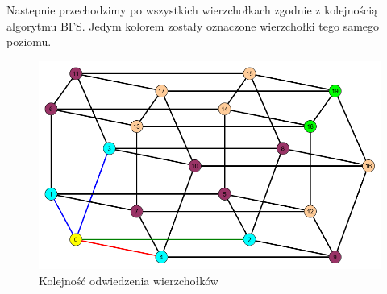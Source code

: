 \documentclass[12pt,a4paper,titlepage]{article}
\newcommand\tab[1][1cm]{\hspace*{#1}}
\begin{document}
\tab[0.6cm]Nastepnie przechodzimy po wszystkich wierzchołkach zgodnie z kolejnością algorytmu BFS. Jedym kolorem zostały oznaczone wierzchołki tego samego poziomu.
\begin{figure}[h]
\centering
\includegraphics[width = 11.9cm]{kol2.png}
\caption{Kolejność odwiedzenia wierzchołków}
\end{figure}
\\
\\
\end{document}
